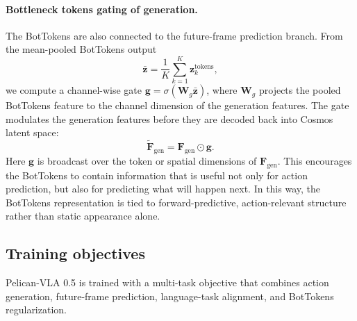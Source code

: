 \documentclass[a4paper,table]{extarticle}
\begin{document}
\paragraph{Bottleneck tokens gating of generation.}
The BotTokens are also connected to the future-frame prediction branch. From the mean-pooled BotTokens output
\begin{equation}
\bar{\mathbf z}
=
\frac{1}{K}
\sum_{k=1}^{K}\mathbf z^{\mathrm{tokens}}_k,
\end{equation}
we compute a channel-wise gate $\mathbf g=\sigma(\mathbf W_g \bar{\mathbf z})$, where $\mathbf W_g$ projects the pooled BotTokens feature to the channel dimension of the generation features. The gate modulates the generation features before they are decoded back into Cosmos latent space:
\begin{equation}
\tilde{\mathbf F}_{\mathrm{gen}}
=
\mathbf F_{\mathrm{gen}} \odot \mathbf g.
\end{equation}
Here $\mathbf g$ is broadcast over the token or spatial dimensions of $\mathbf F_{\mathrm{gen}}$. This encourages the BotTokens to contain information that is useful not only for action prediction, but also for predicting what will happen next. In this way, the BotTokens representation is tied to forward-predictive, action-relevant structure rather than static appearance alone.

\subsection{Training objectives}
\label{sec:method:obj}

Pelican-VLA 0.5 is trained with a multi-task objective that combines action generation, future-frame prediction, language-task alignment, and BotTokens regularization.
\end{document}
